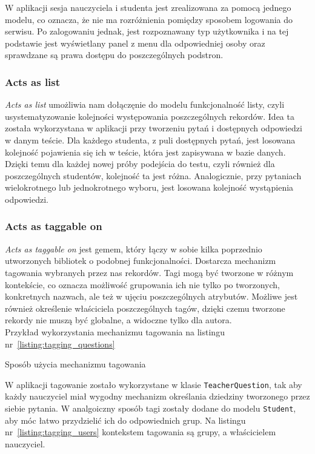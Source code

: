 \documentclass[a4paper,12pt]{article}
\begin{document}
W aplikacji sesja nauczyciela i studenta jest zrealizowana za pomocą jednego modelu, co
oznacza, że nie ma rozróżnienia pomiędzy sposobem logowania do serwisu. Po zalogowaniu
jednak, jest rozpoznawany typ użytkownika i na tej podstawie jest wyświetlany panel z menu
dla odpowiedniej osoby oraz sprawdzane są prawa dostępu do poszczególnych podstron.

\subsubsection{Acts as list}
\emph{Acts as list} umożliwia nam dołączęnie do modelu funkcjonalność listy, czyli
usystematyzowanie kolejności występowania poszczególnych rekordów. Idea ta została
wykorzystana w aplikacji przy tworzeniu pytań i dostępnych odpowiedzi w danym teście.
Dla każdego studenta, z puli dostępnych pytań, jest losowana kolejność pojawienia się ich w
teście, która jest zapisywana w bazie danych. Dzięki temu dla każdej nowej próby podejścia
do testu, czyli również dla poszczególnych studentów, kolejność ta jest różna.
Analogicznie, przy pytaniach wielokrotnego lub jednokrotnego wyboru, jest losowana
kolejność wystąpienia odpowiedzi.

\subsubsection{Acts as taggable on}\label{sec:acts_as_taggable_on}
\emph{Acts as taggable on} jest gemem, który łączy w sobie kilka poprzednio utworzonych
bibliotek o podobnej funkcjonalności. Dostarcza mechanizm tagowania wybranych przez
nas rekordów. Tagi mogą być tworzone w różnym kontekście, co oznacza możliwość grupowania
ich nie tylko po tworzonych, konkretnych nazwach, ale też w ujęciu poszczególnych
atrybutów. Możliwe jest również określenie właściciela poszczególnych tagów, dzięki czemu
tworzone rekordy nie muszą być globalne, a widoczne tylko dla autora.\\
Przykład wykorzystania mechanizmu tagowania na listingu nr~\ref{listing:tagging_questions}

\begin{listing}
  
  \caption{Sposób użycia mechanizmu tagowania}
  \label{listing:tagging_questions}
\end{listing}


W aplikacji tagowanie zostało wykorzystane w klasie \texttt{TeacherQuestion}, tak aby
każdy nauczyciel miał wygodny mechanizm określania dziedziny tworzonego przez siebie
pytania. W analgoiczny sposób tagi zostały dodane do modelu \texttt{Student}, aby móc
łatwo przydzielić ich do odpowiednich grup. Na listingu nr~\ref{listing:tagging_users}
kontekstem tagowania są grupy, a właścicielem nauczyciel.
\end{document}
